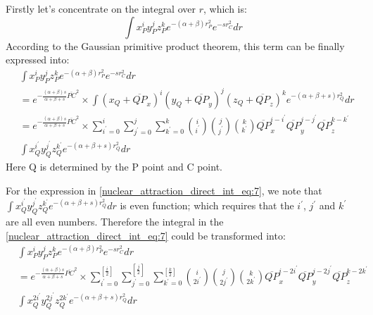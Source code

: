 Firstly let's concentrate on the integral over $r$, which is:
\begin{equation}
  \int x_{P}^{i}y_{P}^{j}z_{P}^{k} e^{-(\alpha+\beta)r_{P}^{2}}e^{-sr_{C}^{2}} dr
\end{equation}
According to the Gaussian primitive product theorem, this term can be finally expressed 
into:
\begin{equation}
\begin{split}
&\int x_{P}^{i}y_{P}^{j}z_{P}^{k} e^{-(\alpha+\beta)r_{P}^{2}}e^{-sr_{C}^{2}} dr  \\
&=
e^{-\frac{(\alpha+\beta)s}{\alpha+\beta + s} \overline{PC}^{2}}\times
\int(x_{Q}+\overline{QP}_{x})^{i}(y_{Q}+\overline{QP}_{y})^{j}(z_{Q}+\overline{QP}_{z})^{k}
e^{-(\alpha+\beta + s)r_{Q}^{2}} dr \\ 
&=
e^{-\frac{(\alpha+\beta)s}{\alpha+\beta + s} \overline{PC}^{2}}\times
\sum_{i^{'}=0}^{i}\sum_{j^{'}=0}^{j}\sum_{k^{'}=0}^{k}
\binom{i}{i^{'}}\binom{j}{j^{'}}\binom{k}{k^{'}}
\overline{QP}_{x}^{i-i^{'}}\overline{QP}_{y}^{j-j^{'}}\overline{QP}_{z}^{k-k^{'}} \\
&\int x_{Q}^{i^{'}}y_{Q}^{j^{'}}z_{Q}^{k^{'}} e^{-(\alpha+\beta+s)r_{Q}^{2}} dr
\end{split}
 \label{nuclear_attraction_direct_int_eq:7}
\end{equation}
Here Q is determined by the P point and C point.

For the expression in \ref{nuclear_attraction_direct_int_eq:7}, we note that 
$\int x_{Q}^{i^{'}}y_{Q}^{j^{'}}z_{Q}^{k^{'}} e^{-(\alpha+\beta+s)r_{Q}^{2}} dr$ is even function; 
which requires that the $i^{'}$, $j^{'}$ and $k^{'}$ are all even numbers. Therefore the integral
in the \ref{nuclear_attraction_direct_int_eq:7} could be transformed into:
\begin{equation}
\begin{split}
&\int x_{P}^{i}y_{P}^{j}z_{P}^{k} e^{-(\alpha+\beta)r_{P}^{2}}e^{-sr_{C}^{2}} dr  \\
&=
e^{-\frac{(\alpha+\beta)s}{\alpha+\beta + s} \overline{PC}^{2}}\times
\sum_{i^{'}=0}^{\left[ \frac{i}{2}\right] }
\sum_{j^{'}=0}^{\left[ \frac{j}{2}\right]}
\sum_{k^{'}=0}^{\left[ \frac{k}{2}\right]}
\binom{i}{2i^{'}}\binom{j}{2j^{'}}\binom{k}{2k^{'}}
\overline{QP}_{x}^{i-2i^{'}}\overline{QP}_{y}^{j-2j^{'}}\overline{QP}_{z}^{k-2k^{'}} \\
&\int x_{Q}^{2i^{'}}y_{Q}^{2j^{'}}z_{Q}^{2k^{'}} e^{-(\alpha+\beta+s)r_{Q}^{2}} dr
\end{split}
 \label{nuclear_attraction_direct_int_eq:7_1}
\end{equation}


